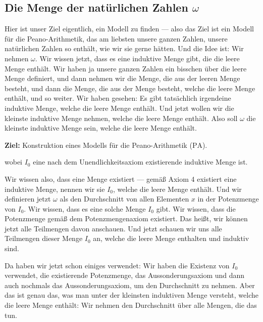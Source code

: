 \subsection{Die Menge der natürlichen Zahlen \texorpdfstring{$\omega$}{omega}}
\begin{spoken-clean}[00:45:01 - 00:46:16]
Hier ist unser Ziel eigentlich, ein Modell zu finden --- also das Ziel ist ein Modell für die Peano-Arithmetik, das am liebsten unsere ganzen Zahlen, unsere natürlichen Zahlen so enthält, wie wir sie gerne hätten. Und die Idee ist: Wir nehmen $\omega$. Wir wissen jetzt, dass es eine induktive Menge gibt, die die leere Menge enthält. Wir haben ja unsere ganzen Zahlen ein bisschen über die leere Menge definiert, und dann nehmen wir die Menge, die aus der leeren Menge besteht, und dann die Menge, die aus der Menge besteht, welche die leere Menge enthält, und so weiter. Wir haben gesehen: Es gibt tatsächlich irgendeine induktive Menge, welche die leere Menge enthält. Und jetzt wollen wir die kleinste induktive Menge nehmen, welche die leere Menge enthält. Also soll $\omega$ die kleinste induktive Menge sein, welche die leere Menge enthält.
\end{spoken-clean}

\begin{math-stroke}
\textbf{Ziel:} Konstruktion eines Modells für die Peano-Arithmetik ($\text{PA}$).

wobei $I_0$ eine nach dem Unendlichkeitsaxiom existierende induktive Menge ist.
\end{math-stroke}

\begin{spoken-clean}[00:46:16 - 00:47:57]
Wir wissen also, dass eine Menge existiert --- gemäß Axiom 4 existiert eine induktive Menge, nennen wir sie $I_0$, welche die leere Menge enthält. Und wir definieren jetzt $\omega$ als den Durchschnitt von allen Elementen $x$ in der Potenzmenge von $I_0$. Wir wissen, dass es eine solche Menge $I_0$ gibt. Wir wissen, dass die Potenzmenge gemäß dem Potenzmengenaxiom existiert. Das heißt, wir können jetzt alle Teilmengen davon anschauen. Und jetzt schauen wir uns alle Teilmengen dieser Menge $I_0$ an, welche die leere Menge enthalten und induktiv sind.

Da haben wir jetzt schon einiges verwendet: Wir haben die Existenz von $I_0$ verwendet, die existierende Potenzmenge, das Aussonderungsaxiom und dann auch nochmals das Aussonderungsaxiom, um den Durchschnitt zu nehmen. Aber das ist genau das, was man unter der kleinsten induktiven Menge versteht, welche die leere Menge enthält: Wir nehmen den Durchschnitt über alle Mengen, die das tun.
\end{spoken-clean}

